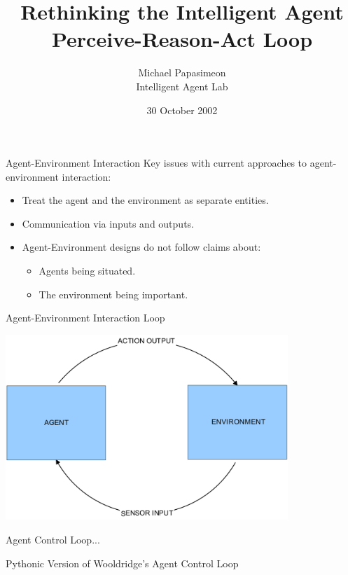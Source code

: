 \documentclass[xcolor=dvipsnames,t]{beamer}
\title[Intelligent Agents]{Rethinking the Intelligent Agent \\ Perceive-Reason-Act Loop}
\author{Michael Papasimeon \\[0.2cm] \tiny{Intelligent Agent Lab} }
\date{30 October 2002}
\newcommand{\showcode}[1]{\begin{mdframed}[style=code] %
                          \end{mdframed}%
}
\begin{document}
\begin{frame}
    \maketitle
\end{frame} 

\begin{frame}{Agent-Environment Interaction} 
    Key issues with current approaches to agent-environment interaction:
    \begin{itemize}
        \item Treat the agent and the environment as separate entities.
        \item Communication via inputs and outputs.
        \item Agent-Environment designs do not follow claims about:
            \begin{itemize}
                \item Agents being situated.
                \item The environment being important. 
            \end{itemize} 
    \end{itemize} 
\end{frame} 

\begin{frame}{Agent-Environment Interaction Loop} 
    \begin{center}
        \includegraphics[width=0.8\textwidth]{loop} 
    \end{center} 
\end{frame} 

\begin{frame}{Agent Control Loop...}
    \begin{block}{Pythonic Version of Wooldridge's Agent Control Loop} 
        \showcode{wooldridge.py} 
    \end{block} 
\end{frame} 
\end{document}
